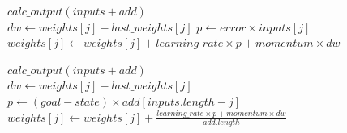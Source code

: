 \documentclass[a4paper,12pt, twoside]{article}
\begin{document}
\begin{algorithmic}

\State $calc\_output(inputs + add)$
\\
\State $dw \gets weights[j] - last\_weights[j]$
\State $p \gets error \times inputs[j]$
\State $weights[j] \gets weights[j] + learning\_rate \times p + momentum \times dw$
\EndFor
\EndFunction

\end{algorithmic}


\begin{algorithmic}

\State $calc\_output(inputs + add)$
\\
\State $dw \gets weights[j] - last\_weights[j]$
\State $p \gets (goal - state ) \times add[inputs.length - j]$
\State $weights[j] \gets weights[j] + \frac{learning\_rate \times p + momentum \times dw}{add.length} $
\EndFor
\EndFunction

\end{algorithmic}
\end{document}
